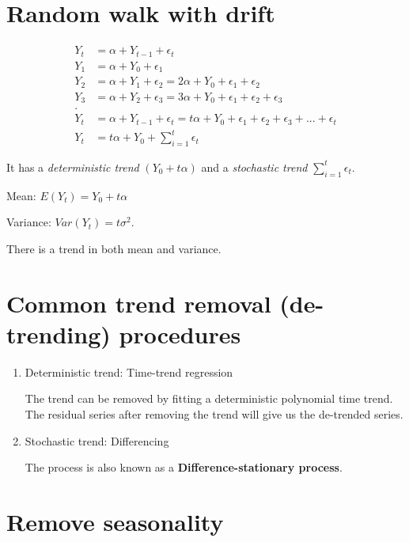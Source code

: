 \documentclass[
  11pt,
  a4paper,
]{report}
\begin{document}
\section{Random walk with drift}\label{random-walk-with-drift}

\[
\begin{aligned}
  Y_t &= \alpha + Y_{t-1} + \epsilon_t \\
     Y_1    &= \alpha+Y_0 + \epsilon_1 \\
         Y_2 &= \alpha+ Y_1 + \epsilon_2=2 \alpha+Y_0 + \epsilon_1 + \epsilon_2\\
          Y_3 &= \alpha+ Y_2 + \epsilon_3= 3 \alpha+ Y_0 + \epsilon_1 + \epsilon_2 +\epsilon_3\\
          .   \\
          Y_t &= \alpha+Y_{t-1} + \epsilon_t= t \alpha+ Y_0 + \epsilon_1 + \epsilon_2 + \epsilon_3 +...+ \epsilon_t \\
          Y_t &= t \alpha + Y_0 + \sum_{i=1}^{t} \epsilon_t
\end{aligned}
\]

It has a \emph{deterministic trend} \((Y_0 + t \alpha)\) and a
\emph{stochastic trend} \(\sum_{i=1}^{t} \epsilon_t\).

Mean: \(E(Y_t) = Y_0 + t\alpha\)

Variance: \(Var(Y_t) = t\sigma^2\).

There is a trend in both mean and variance.

\section{Common trend removal (de-trending)
procedures}\label{common-trend-removal-de-trending-procedures}

\begin{enumerate}
\def\labelenumi{\arabic{enumi}.}
\item
  Deterministic trend: Time-trend regression

  The trend can be removed by fitting a deterministic polynomial time
  trend. The residual series after removing the trend will give us the
  de-trended series.
\item
  Stochastic trend: Differencing

  The process is also known as a \textbf{Difference-stationary process}.
\end{enumerate}

\section{Remove seasonality}\label{remove-seasonality}
\end{document}
